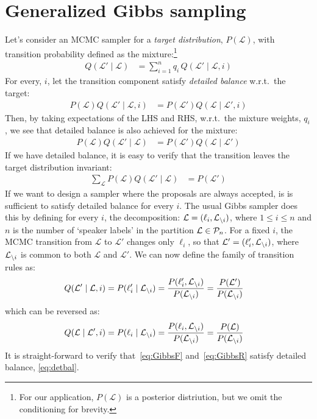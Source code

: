 \documentclass[a4paper,oneside,12pt,english]{report}
\def\Lset{\mathcal{L}}
\begin{document}
\chapter{Generalized Gibbs sampling}
Let's consider an MCMC sampler for a \emph{target distribution}, $P(\Lset)$, with transition probability defined as the mixture:\footnote{For our application, $P(\Lset)$ is a posterior distriution, but we omit the conditioning for brevity.} 
\begin{align}
Q(\Lset'\mid \Lset) &= \sum_{i=1}^n q_i\, Q(\Lset'\mid\Lset,i)
\end{align}
For every, $i$, let the transition component satisfy \emph{detailed balance} w.r.t.\ the target:
\begin{align}
\label{eq:detbal}
P(\Lset)Q(\Lset'\mid\Lset,i) &= P(\Lset')Q(\Lset\mid\Lset',i) 
\end{align}
Then, by taking expectations of the LHS and RHS, w.r.t.\ the mixture weights, $q_i$, we see that detailed balance is also achieved for the mixture: 
\begin{align}
P(\Lset)Q(\Lset'\mid\Lset) &= P(\Lset')Q(\Lset\mid\Lset') 
\end{align}
If we have detailed balance, it is easy to verify that the transition leaves the target distribution invariant:
\begin{align}
\sum_{\Lset} P(\Lset)Q(\Lset'\mid\Lset) &= P(\Lset') 
\end{align}
If we want to design a sampler where the proposals are always accepted, is is sufficient to satisfy detailed balance for every $i$. The usual Gibbs sampler does this by defining for every $i$, the decomposition: $\Lset=(\ell_i,\Li)$, where $1\le i\le n$ and $n$ is the number of `speaker labels' in the partition $\Lset\in\Pset_n$. For a fixed $i$, the MCMC transition from $\Lset$ to $\Lset'$ changes only $\ell_i$, so that $\Lset'=(\ell'_i,\Li)$, where $\Li$ is common to both $\Lset$ and $\Lset'$. We can now define the family of transition rules as:
\begin{align}
\label{eq:GibbsF}
Q(\Lset'\mid\Lset,i) &= P(\ell'_i\mid\Li) = \frac{P(\ell'_i,\Li)}{P(\Li)} = \frac{P(\Lset')}{P(\Li)}
\end{align}
which can be reversed as:
\begin{align}
\label{eq:GibbsR}
Q(\Lset\mid\Lset',i) &= P(\ell_i\mid\Li) = \frac{P(\ell_i,\Li)}{P(\Li)} = \frac{P(\Lset)}{P(\Li)}
\end{align}
It is straight-forward to verify that~\eqref{eq:GibbsF} and~\eqref{eq:GibbsR} satisfy detailed balance, \eqref{eq:detbal}.  
\end{document}

